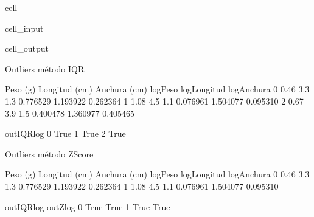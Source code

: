 \documentclass[a4paper,10pt,spanish]{jupyterBook}
\begin{document}
\begin{sphinxuseclass}{cell}
\begin{sphinxVerbatimInput}
\begin{sphinxuseclass}{cell_input}
\begin{sphinxVerbatim}[commandchars=\\\{\}]
\PYG{p}{[}\PYG{p}{]}   
\PYG{p}{[}\PYG{p}{[}\PYG{p}{]}\PYG{p}{]}
\end{sphinxVerbatim}

\end{sphinxuseclass}\end{sphinxVerbatimInput}
\begin{sphinxVerbatimOutput}

\begin{sphinxuseclass}{cell_output}
\begin{sphinxVerbatim}[commandchars=\\\{\}]
Outliers método IQR
\end{sphinxVerbatim}

\begin{sphinxVerbatim}[commandchars=\\\{\}]
   Peso (g)  Longitud (cm)  Anchura (cm)  log\PYGZus{}Peso  log\PYGZus{}Longitud  log\PYGZus{}Anchura  \PYGZbs{}
0      0.46            3.3           1.3 \PYGZhy{}0.776529      1.193922     0.262364
1      1.08            4.5           1.1  0.076961      1.504077     0.095310
2      0.67            3.9           1.5 \PYGZhy{}0.400478      1.360977     0.405465

   out\PYGZus{}IQR\PYGZus{}log
0         True
1         True
2         True
\end{sphinxVerbatim}

\begin{sphinxVerbatim}[commandchars=\\\{\}]
Outliers método Z\PYGZhy{}Score
\end{sphinxVerbatim}

\begin{sphinxVerbatim}[commandchars=\\\{\}]
   Peso (g)  Longitud (cm)  Anchura (cm)  log\PYGZus{}Peso  log\PYGZus{}Longitud  log\PYGZus{}Anchura  \PYGZbs{}
0      0.46            3.3           1.3 \PYGZhy{}0.776529      1.193922     0.262364
1      1.08            4.5           1.1  0.076961      1.504077     0.095310

   out\PYGZus{}IQR\PYGZus{}log  out\PYGZus{}Z\PYGZus{}log
0         True       True
1         True       True
\end{sphinxVerbatim}


\end{sphinxuseclass}
\end{sphinxVerbatimOutput}
\end{sphinxuseclass}
\end{document}
